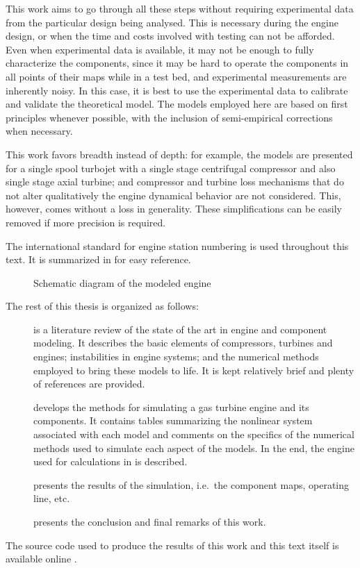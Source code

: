 This work aims to go through all these steps without requiring experimental data from the particular design being analysed.
This is necessary during the engine design, or when the time and costs involved with testing can not be afforded.
Even when experimental data is available, it may not be enough to fully characterize the components,
since it may be hard to operate the components in all points of their maps while in a test bed,
and experimental measurements are inherently noisy. 
In this case, it is best to use the experimental data to calibrate and validate the theoretical model.
The models employed here are based on first principles whenever possible, 
with the inclusion of semi-empirical corrections when necessary. 

This work favors breadth instead of depth: 
for example, the models are presented for a single spool turbojet with a single stage centrifugal compressor and also single stage axial turbine; and compressor and turbine loss mechanisms that do not alter qualitatively the engine dynamical behavior are not considered. 
This, however, comes without a loss in generality. 
These simplifications can be easily removed if more precision is required.

The international standard for engine station numbering \cite{ARP755A} is used throughout this text. 
It is summarized in  for easy reference.

\begin{figure}[b]
    \caption{Schematic diagram of the modeled engine}
    \label{fig:engine_schematic}
    
    \source{\authorsfigure}
\end{figure}


The rest of this thesis is organized as follows: 
\begin{description}
    \item[] is a literature review of the state of the art in engine and component modeling. 
        It describes the basic elements of compressors, turbines and engines; 
        instabilities in engine systems; and the numerical methods employed to bring these models to life. 
        It is kept relatively brief and plenty of references are provided.
    \item[] develops the methods for simulating a gas turbine engine and its components. 
        It contains tables summarizing the nonlinear system associated with each model 
        and comments on the specifics of the numerical methods used to simulate each aspect of the models. 
        In the end, the engine used for calculations in  is described.
    \item[] presents the results of the simulation, i.e.\ the component maps, operating line, etc.
    \item[] presents the conclusion and final remarks of this work.
\end{description}
The source code used to produce the results of this work and this text itself is available online \cite{bernardo2019}.

